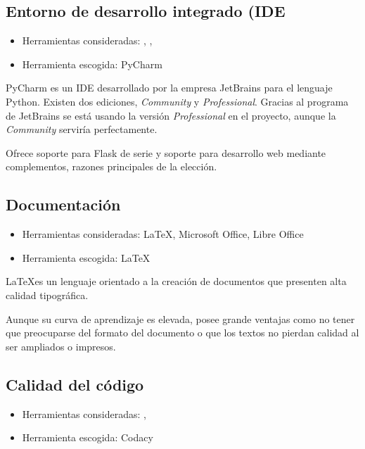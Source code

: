 \subsection{Entorno de desarrollo integrado (IDE}

\begin{itemize}
	\tightlist
	\item Herramientas consideradas:
	,
	,
	\item Herramienta escogida: PyCharm
\end{itemize}

PyCharm es un IDE desarrollado por la empresa JetBrains para el lenguaje Python.
Existen dos ediciones, \textit{Community} y \textit{Professional}. Gracias al
programa  de
JetBrains se está usando la versión \textit{Professional} en el proyecto, aunque
la \textit{Community} serviría perfectamente.

Ofrece soporte para Flask de serie y soporte para desarrollo web mediante
complementos, razones principales de la elección.

\subsection{Documentación}

\begin{itemize}
	\tightlist
	\item Herramientas consideradas: \LaTeX, Microsoft Office, Libre Office
	\item Herramienta escogida: \LaTeX
\end{itemize}

\LaTeX es un lenguaje orientado a la creación de documentos que presenten alta
calidad tipográfica.

Aunque su curva de aprendizaje es elevada, posee grande ventajas como no tener
que preocuparse del formato del documento o que los textos no pierdan calidad al
ser ampliados o impresos.

\subsection{Calidad del código}

\begin{itemize}
	\tightlist
	\item Herramientas consideradas:
	,
	\item Herramienta escogida: Codacy
\end{itemize}

